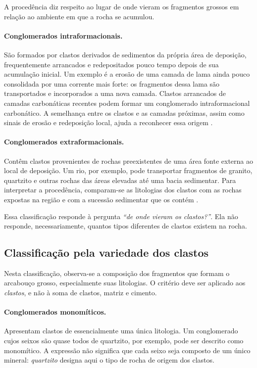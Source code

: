 \documentclass[a4paper,12pt]{article}
\theoremstyle{definition}
\theoremstyle{definition}
\theoremstyle{definition}
\begin{document}
A procedência diz respeito ao lugar de onde vieram os fragmentos
grossos em relação ao ambiente em que a rocha se acumulou.

\paragraph{Conglomerados intraformacionais.}
São formados por clastos derivados de sedimentos da própria área
de deposição, frequentemente arrancados e redepositados pouco
tempo depois de sua acumulação inicial. Um exemplo é a erosão de
uma camada de lama ainda pouco consolidada por uma corrente mais
forte: os fragmentos dessa lama são transportados e incorporados
a uma nova camada. Clastos arrancados de camadas carbonáticas
recentes podem formar um conglomerado intraformacional
carbonático. A semelhança entre os clastos e as camadas próximas,
assim como sinais de erosão e redeposição local, ajuda a reconhecer
essa origem \autocite{mit2007siliciclastic}.

\paragraph{Conglomerados extraformacionais.}
Contêm clastos provenientes de rochas preexistentes de uma área
fonte externa ao local de deposição. Um rio, por exemplo, pode
transportar fragmentos de granito, quartzito e outras rochas das
áreas elevadas até uma bacia sedimentar. Para interpretar a
procedência, comparam-se as litologias dos clastos com as rochas
expostas na região e com a sucessão sedimentar que os contém
\autocite{mit2007siliciclastic}.

Essa classificação responde à pergunta \emph{``de onde vieram os
clastos?''}. Ela não responde, necessariamente, quantos tipos
diferentes de clastos existem na rocha.

\subsection{Classificação pela variedade dos clastos}

Nesta classificação, observa-se a composição dos fragmentos que
formam o arcabouço grosso, especialmente suas litologias. O
critério deve ser aplicado aos \emph{clastos}, e não à soma de
clastos, matriz e cimento.

\paragraph{Conglomerados monomíticos.}
Apresentam clastos de essencialmente uma única litologia. Um
conglomerado cujos seixos são quase todos de quartzito, por
exemplo, pode ser descrito como monomítico. A expressão não
significa que cada seixo seja composto de um único mineral:
\emph{quartzito} designa aqui o tipo de rocha de origem dos clastos.
\end{document}
